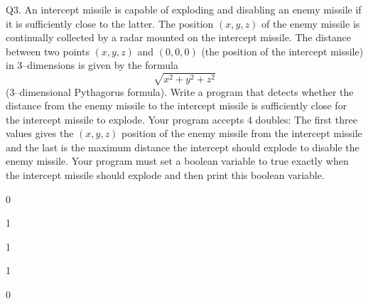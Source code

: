 Q3. An intercept missile is capable of exploding and disabling an enemy missile if
it is sufficiently close to the latter. The position $(x,y,z)$ of the enemy
missile is continually collected by a radar mounted on the intercept missile.
The distance between two points $(x,y,z)$ and $(0,0,0)$ (the position of the
intercept missile) in $3$--dimensions is given by the formula
\[\sqrt{x^2 + y^2 + z^2}\]
($3$--dimensional Pythagorus formula). Write a program that detects whether the
distance from the enemy missile to the intercept missile is sufficiently close
for the intercept missile to explode. Your program accepts $4$ doubles: The
first three values gives the $(x,y,z)$ position of the enemy missile from the
intercept missile and the last is the maximum distance the intercept should
explode to disable the enemy missile. Your program must set a boolean variable
to true exactly when the intercept missile should explode and then print this
boolean variable.

\resett
\nextt
\begin{console}[commandchars=\\\{\}]
0
\end{console}

\nextt
\begin{console}[commandchars=\\\{\}]
1
\end{console}

\nextt
\begin{console}[commandchars=\\\{\}]
1
\end{console}

\nextt
\begin{console}[commandchars=\\\{\}]
1
\end{console}

\nextt
\begin{console}[commandchars=\\\{\}]
0
\end{console}
